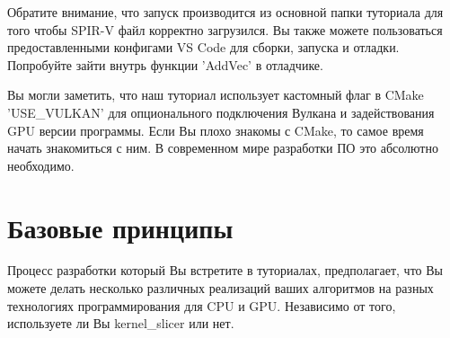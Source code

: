 \documentclass[11pt,fleqn,english,russian]{report} %
\begin{document}
Обратите внимание, что запуск производится из основной папки туториала для того чтобы SPIR-V файл корректно загрузился. Вы также можете пользоваться предоставленными конфигами VS Code для сборки, запуска и отладки. Попробуйте зайти внутрь функции 'AddVec' в отладчике.



\begin{remark} 
Вы могли заметить, что наш туториал использует кастомный флаг в CMake 'USE\_VULKAN' для опционального подключения Вулкана и задействования GPU версии программы. Если Вы плохо знакомы с CMake, то самое время начать знакомиться с ним. В современном мире разработки ПО это абсолютно необходимо. 
\end{remark}

\chapter{Базовые принципы}

Процесс разработки который Вы встретите в туториалах, предполагает, что Вы можете делать несколько различных реализаций ваших алгоритмов на разных технологиях программирования для CPU и GPU. Независимо от того, используете ли Вы kernel\_slicer или нет. 
\end{document}
